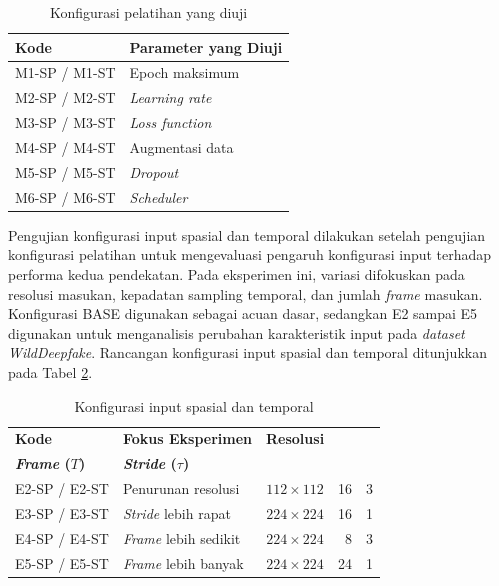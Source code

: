 \begin{table}[H]
\centering
\caption{Konfigurasi pelatihan yang diuji}
\label{tab:3.rancangan-ablation}
\begin{tabular}{ll}
\toprule
\textbf{Kode} & \textbf{Parameter yang Diuji} \\
\midrule
M1-SP / M1-ST & Epoch maksimum \\
M2-SP / M2-ST & \textit{Learning rate} \\
M3-SP / M3-ST & \textit{Loss function} \\
M4-SP / M4-ST & Augmentasi data \\
M5-SP / M5-ST & \textit{Dropout} \\
M6-SP / M6-ST & \textit{Scheduler} \\
\bottomrule
\end{tabular}
\end{table}
\par

Pengujian konfigurasi input spasial dan temporal dilakukan setelah pengujian konfigurasi pelatihan untuk mengevaluasi pengaruh konfigurasi input terhadap performa kedua pendekatan. Pada eksperimen ini, variasi difokuskan pada resolusi masukan, kepadatan sampling temporal, dan jumlah \textit{frame} masukan. Konfigurasi BASE digunakan sebagai acuan dasar, sedangkan E2 sampai E5 digunakan untuk menganalisis perubahan karakteristik input pada \textit{dataset} \textit{WildDeepfake}. Rancangan konfigurasi input spasial dan temporal ditunjukkan pada Tabel \ref{tab:3.rancangan-utama}. \par

\begin{table}[H]
\centering
\caption{Konfigurasi input spasial dan temporal}
\label{tab:3.rancangan-utama}
\begin{tabular}{llcrr}
\toprule
\textbf{Kode} & \textbf{Fokus Eksperimen} & \textbf{Resolusi} & \shortstack[c]{\textbf{Jumlah}\\ \textbf{\textit{Frame} ($T$)}} & \textbf{\textit{Stride} ($\tau$)} \\
\midrule
E2-SP / E2-ST & Penurunan resolusi & $112 \times 112$ & 16 & 3 \\
E3-SP / E3-ST & \textit{Stride} lebih rapat & $224 \times 224$ & 16 & 1 \\
E4-SP / E4-ST & \textit{Frame} lebih sedikit & $224 \times 224$ & 8 & 3 \\
E5-SP / E5-ST & \textit{Frame} lebih banyak & $224 \times 224$ & 24 & 1 \\
\bottomrule
\end{tabular}
\end{table}
\par

